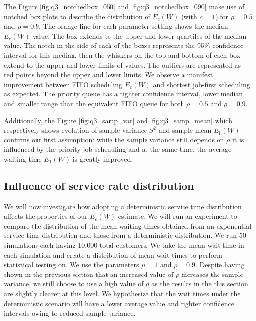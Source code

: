 \documentclass{article}
\begin{document}
    The Figure \ref{fig:q3_notchedbox_050} and \ref{fig:q3_notchedbox_090} make use of notched box plots to describe the distribution of $E_c(W)$ (with $c = 1$) for $\rho = 0.5$ and $\rho = 0.9$. The orange line for each parameter setting shows the median $E_c(W)$ value. The box extends to the upper and lower quartiles of the median value. The notch in the side of each of the boxes represents the 95\% confidence interval for this median, then the whiskers on the top and bottom of each box extend to the upper and lower limits of values. The outliers are represented as red points beyond the upper and lower limits. We observe a manifest improvement between FIFO scheduling $E_c(W)$ and shortest job-first scheduling as expected. The priority queue has a tighter confidence interval, lower median and smaller range than the equivalent FIFO queue for both $\rho = 0.5$ and $\rho = 0.9$.

    Additionally, the Figure \ref{fig:q3_samp_var} and \ref{fig:q3_samp_mean} which respectively shows evolution of sample variance $S^2$ and sample mean $E_1(W)$ confirms our first assumption: while the sample variance still depends on $\rho$ it is influenced by the priority job scheduling and at the same time, the average waiting time $E_1(W)$ is greatly improved.

    \subsection*{Influence of service rate distribution}

    We will now investigate how adopting a deterministic service time distribution affects the properties of our $E_c(W)$ estimate. We will run an experiment to compare the distribution of the mean waiting times obtained from an exponential service time distribution and those from a deterministic distribution. We run 50 simulations each having 10,000 total customers. We take the mean wait time in each simulation and create a distribution of mean wait times to perform statistical testing on. We use the parameters $\mu = 1$ and $\rho = 0.9$. Despite having shown in the previous section that an increased value of $\rho$ increases the sample variance, we still choose to use a high value of $\rho$ as the results in the this section are slightly clearer at this level. We hypothesize that the wait times under the deterministic scenario will have a lower average value and tighter confidence intervals owing to reduced sample variance.
\end{document}
